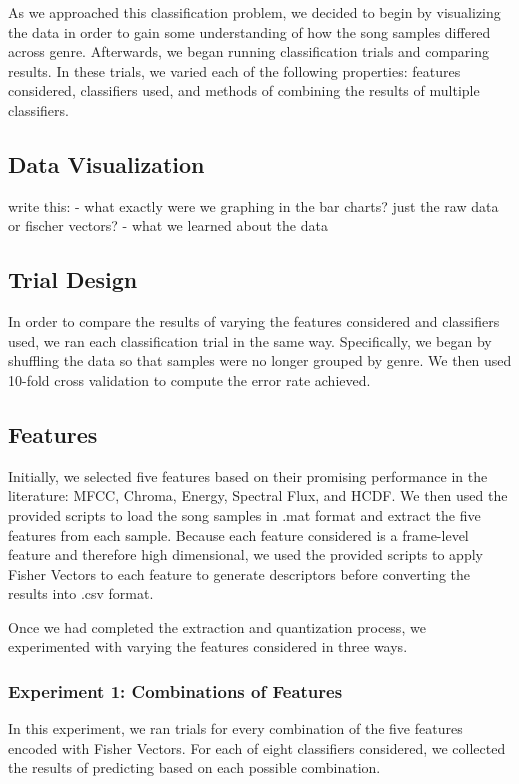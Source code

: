 As we approached this classification problem, we decided to begin by visualizing the data in order to gain some understanding of how the song samples differed across genre. Afterwards, we began running classification trials and comparing results. In these trials, we varied each of the following properties: features considered, classifiers used, and methods of combining the results of multiple classifiers.

\subsection{Data Visualization}
write this:
- what exactly were we graphing in the bar charts? just the raw data or fischer vectors?
- what we learned about the data

\subsection{Trial Design}
In order to compare the results of varying the features considered and classifiers used, we ran each classification trial in the same way. Specifically, we began by shuffling the data so that samples were no longer grouped by genre. We then used 10-fold cross validation to compute the error rate achieved. 

\subsection{Features}
Initially, we selected five features based on their promising performance in the literature: MFCC, Chroma, Energy, Spectral Flux, and HCDF. We then used the provided scripts to load the song samples in .mat format and extract the five features  from each sample. Because each feature considered is a frame-level feature and therefore high dimensional, we used the provided scripts to apply Fisher Vectors to each feature to generate descriptors before converting the results into .csv format. 

Once we had completed the extraction and quantization process, we experimented with varying the features considered in three ways.

\subsubsection{Experiment 1: Combinations of Features}
In this experiment, we ran trials for every combination of the five features encoded with Fisher Vectors. For each of eight classifiers considered, we collected the results of predicting based on each possible combination.

